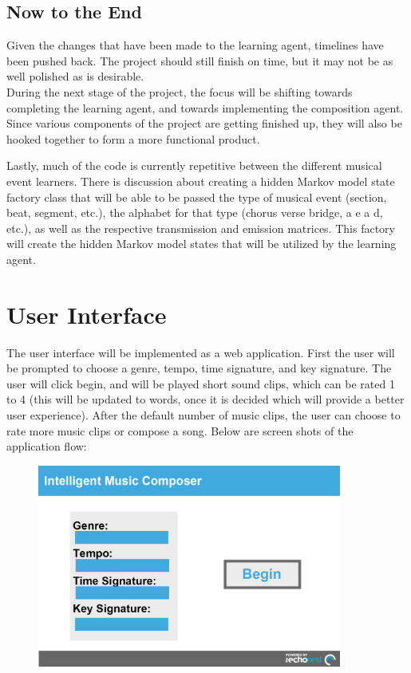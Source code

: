 \documentclass{article}
\begin{document}
\subsection{Now to the End}
Given the changes that have been made to the learning agent, timelines have been pushed back. The project
should still finish on time, but it may not be as well polished as is desirable.
\\
During the next stage of the project, the focus will be shifting towards completing the learning agent, and
towards implementing the composition agent. Since various components of the project are getting finished up,
they will also be hooked together to form a more functional product.

Lastly, much of the code is currently repetitive between the different musical event learners. There is
discussion about creating a hidden Markov model state factory class that will be able to be passed the type of 
musical event (section, beat, segment, etc.), the alphabet for that type (chorus verse bridge, a e a d, etc.),
as well as the respective transmission and emission matrices. This factory
will create the hidden Markov model states that will be utilized by the learning agent.

\section{User Interface}
The user interface will be implemented as a web application. First the user will be prompted 
to choose a genre, tempo, time signature, and key signature.  The user will click begin, and will 
be played short sound clips, which can be rated 1 to 4 (this will be updated to words, once it is 
decided which will provide a better user experience).  After the default number of music clips, the 
user can choose to rate more music clips or compose a song.  
Below are screen shots of the application flow:

\begin{figure}[H]
\centerline{\includegraphics[width=10cm]{begin.png}}
\end{figure}
\end{document}
